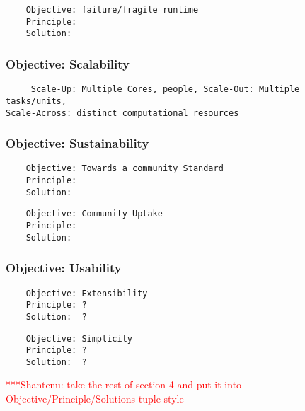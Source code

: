 \documentclass[a4paper,10pt]{article}
\newcommand{\jhanote}[1]{  {\textcolor{red}  { ***Shantenu: #1 }}}
\newcommand{\jhanote}[1]{}
\begin{document}
   \begin{verbatim}
    Objective: failure/fragile runtime 
    Principle: 
    Solution:  
   \end{verbatim}

 \subsubsection{Objective: Scalability}

   \begin{verbatim}
     Scale-Up: Multiple Cores, people, Scale-Out: Multiple tasks/units,
Scale-Across: distinct computational resources
   \end{verbatim}


\subsubsection{Objective: Sustainability}
  \begin{verbatim}
    Objective: Towards a community Standard 
    Principle: 
    Solution:  
   \end{verbatim}

  \begin{verbatim}
    Objective: Community Uptake
    Principle: 
    Solution:  
   \end{verbatim}

\subsubsection{Objective: Usability}

  \begin{verbatim}
    Objective: Extensibility
    Principle: ?
    Solution:  ?
   \end{verbatim}

  \begin{verbatim}
    Objective: Simplicity
    Principle: ?
    Solution:  ?
 \end{verbatim}


 \jhanote{take the rest of section 4 and put it into
   Objective/Principle/Solutions tuple style}
\end{document}
